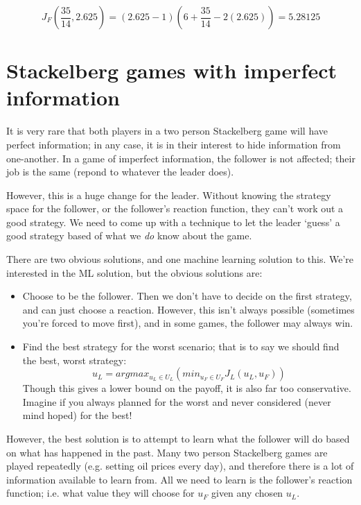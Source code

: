 \[
  J_F(\frac{35}{14}, 2.625) = (2.625 - 1)(6 + \frac{35}{14} - 2(2.625)) = 5.28125
\]


\section{Stackelberg games with imperfect information}

It is very rare that both players in a two person Stackelberg game will have
perfect information; in any case, it is in their interest to hide information
from one-another. In a game of imperfect information, the follower is not
affected; their job is the same (repond to whatever the leader does).

However, this is a huge change for the leader. Without knowing the strategy
space for the follower, or the follower's reaction function, they can't work out
a good strategy. We need to come up with a technique to let the leader `guess' a
good strategy based of what we \textit{do} know about the game.

There are two obvious solutions, and one machine learning solution to this.
We're interested in the ML solution, but the obvious solutions are:

\begin{itemize}
  \item Choose to be the follower. Then we don't have to decide on the first
  strategy, and can just choose a reaction. However, this isn't always possible
  (sometimes you're forced to move first), and in some games, the follower may
  always win.
  \item Find the best strategy for the worst scenario; that is to say we should
  find the best, worst strategy:
  \[
    u_L = argmax_{u_L \in U_L}(min_{u_F \in U_F}J_L(u_L, u_F))
  \]
  Though this gives a lower bound on the payoff, it is also far too
  conservative. Imagine if you always planned for the worst and never considered
  (never mind hoped) for the best!
\end{itemize}

However, the best solution is to attempt to learn what the follower will do
based on what has happened in the past. Many two person Stackelberg games are
played repeatedly (e.g. setting oil prices every day), and therefore there is a
lot of information available to learn from. All we need to learn is the
follower's reaction function; i.e. what value they will choose for $u_F$ given
any chosen $u_L$.

